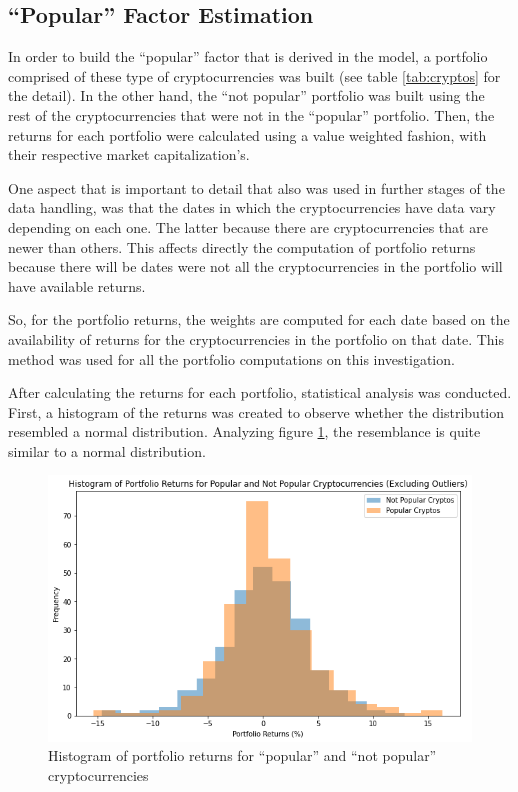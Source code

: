 \subsection{``Popular'' Factor Estimation}
\label{c423}
In order to build the ``popular'' factor that is derived in the model, a portfolio comprised of these type of cryptocurrencies was built (see table \ref{tab:cryptos} for the detail). In the other hand, the ``not popular'' portfolio was built using the rest of the cryptocurrencies that were not in the ``popular'' portfolio. Then, the returns for each portfolio were calculated using a value weighted fashion, with their respective market capitalization's.

One aspect that is important to detail that also was used in further stages of the data handling, was that the dates in which the cryptocurrencies have data vary depending on each one. The latter because there are cryptocurrencies that are newer than others. This affects directly the computation of portfolio returns because there will be dates were not all the cryptocurrencies in the portfolio will have available returns.

So, for the portfolio returns, the weights are computed for each date based on the availability of returns for the cryptocurrencies in the portfolio on that date. This method was used for all the portfolio computations on this investigation.

After calculating the returns for each portfolio, statistical analysis was conducted. First, a histogram of the returns was created to observe whether the distribution resembled a normal distribution. Analyzing figure \ref{fig:histogram-of-portfolio-returns}, the resemblance is quite similar to a normal distribution.
\begin{figure}[h!]
	\centering
	\includegraphics[width=0.95\linewidth]{"Histogram of portfolio returns"}
	\caption{Histogram of portfolio returns for ``popular'' and ``not popular'' cryptocurrencies}
	\label{fig:histogram-of-portfolio-returns}
\end{figure}

